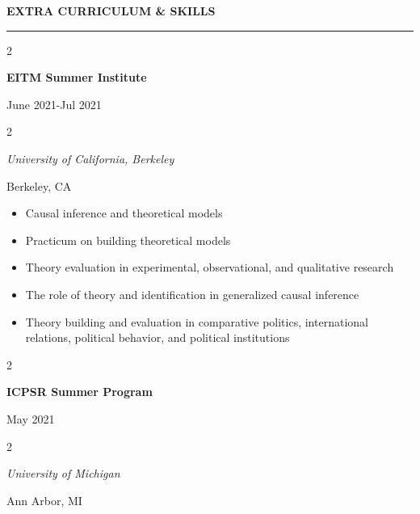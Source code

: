 \documentclass[
  16,
]{article}
\providecommand{\tightlist}{%
  \setlength{\itemsep}{0pt}\setlength{\parskip}{0pt}}
\begin{document}
\vspace{7pt}

\begin{large}
  {\bf EXTRA CURRICULUM \& SKILLS}
  \vspace{3pt}
  \end{large}
  \hrule
  \begin{multicols}{2}
    \begin{flushleft}{\bf EITM Summer Institute}\end{flushleft}
    \begin{flushright}June 2021-Jul 2021\end{flushright}
  \end{multicols}
    \begin{multicols}{2}
    \begin{flushleft}{\it University of California, Berkeley}\end{flushleft}
    \begin{flushright}Berkeley, CA\end{flushright}
  \end{multicols}
  \vspace{-0.17cm}

\begin{itemize}
\tightlist
\item
  Causal inference and theoretical models
\item
  Practicum on building theoretical models
\item
  Theory evaluation in experimental, observational, and qualitative
  research
\item
  The role of theory and identification in generalized causal inference
\item
  Theory building and evaluation in comparative politics, international
  relations, political behavior, and political institutions
\end{itemize}

\begin{multicols}{2}
    \begin{flushleft}{\bf ICPSR Summer Program}\end{flushleft}
    \begin{flushright}May 2021\end{flushright}
  \end{multicols}
    \begin{multicols}{2}
    \begin{flushleft}{\it University of Michigan}\end{flushleft}
    \begin{flushright}Ann Arbor, MI\end{flushright}
  \end{multicols}
  \vspace{-0.17cm}
\end{document}

